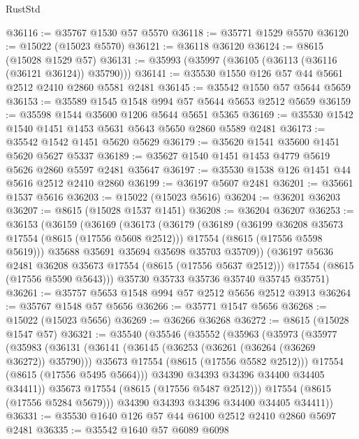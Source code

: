 \begin{lexlean}{RustStd}
\begin{coremodule}
@36116 := @35767 @1530 @57 @5570
@36118 := @35771 @1529 @5570
@36120 := @15022 (@15023 @5570)
@36121 := @36118 @36120
@36124 := @8615 (@15028 @1529 @57)
@36131 := @35993 (@35997 (@36105 (@36113 (@36116 (@36121 @36124)) @35790)))
@36141 := @35530 @1550 @126 @57 @44 @5661 @2512 @2410 @2860 @5581 @2481
@36145 := @35542 @1550 @57 @5644 @5659
@36153 := @35589 @1545 @1548 @994 @57 @5644 @5653 @2512 @5659
@36159 := @35598 @1544 @35600 @1206 @5644 @5651 @5365
@36169 := @35530 @1542 @1540 @1451 @1453 @5631 @5643 @5650 @2860 @5589 @2481
@36173 := @35542 @1542 @1451 @5620 @5629
@36179 := @35620 @1541 @35600 @1451 @5620 @5627 @5337
@36189 := @35627 @1540 @1451 @1453 @4779 @5619 @5626 @2860 @5597 @2481 @35647
@36197 := @35530 @1538 @126 @1451 @44 @5616 @2512 @2410 @2860
@36199 := @36197 @5607 @2481
@36201 := @35661 @1537 @5616
@36203 := @15022 (@15023 @5616)
@36204 := @36201 @36203
@36207 := @8615 (@15028 @1537 @1451)
@36208 := @36204 @36207
@36253 := @36153
    (@36159
      (@36169
        (@36173
          (@36179
            (@36189
              (@36199 @36208 @35673 @17554 (@8615 (@17556 @5608 @2512)))
              @17554
              (@8615 (@17556 @5598 @5619)))
            @35688
            @35691
            @35694
            @35698
            @35703
            @35709))
        (@36197 @5636 @2481 @36208 @35673 @17554 (@8615 (@17556 @5637 @2512)))
        @17554
        (@8615 (@17556 @5590 @5643)))
      @35730
      @35733
      @35736
      @35740
      @35745
      @35751)
@36261 := @35757 @5653 @1548 @994 @57 @2512 @5656 @2512 @3913
@36264 := @35767 @1548 @57 @5656
@36266 := @35771 @1547 @5656
@36268 := @15022 (@15023 @5656)
@36269 := @36266 @36268
@36272 := @8615 (@15028 @1547 @57)
@36321 := @35540
    (@35546
      (@35552
        (@35963
          (@35973
            (@35977
              (@35983
                (@36131
                  (@36141
                    (@36145 (@36253 (@36261 (@36264 (@36269 @36272)) @35790)))
                    @35673
                    @17554
                    (@8615 (@17556 @5582 @2512)))
                  @17554
                  (@8615 (@17556 @5495 @5664)))
                @34390
                @34393
                @34396
                @34400
                @34405
                @34411))
            @35673
            @17554
            (@8615 (@17556 @5487 @2512)))
          @17554
          (@8615 (@17556 @5284 @5679)))
        @34390
        @34393
        @34396
        @34400
        @34405
        @34411))
@36331 := @35530 @1640 @126 @57 @44 @6100 @2512 @2410 @2860 @5697 @2481
@36335 := @35542 @1640 @57 @6089 @6098

\end{coremodule}
\end{lexlean}
